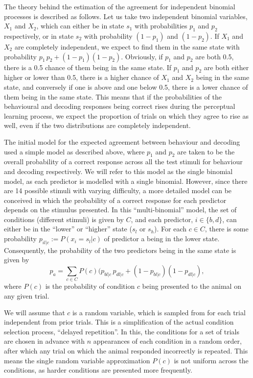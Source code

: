 The theory behind the estimation of the agreement for independent binomial processes is described as follows. Let us take two independent binomial variables, $X_1$ and $X_2$, which can either be in state $s_1$ with probabilities $p_1$ and $p_2$ respectively, or in state $s_2$ with probability $(1-p_1)$ and $(1-p_2)$.
If $X_1$ and $X_2$ are completely independent, we expect to find them in the same state with probability $p_1 \, p_2 + (1-p_1) (1-p_2)$. Obviously, if $p_1$ and $p_2$ are both 0.5, there is a 0.5 chance of them being in the same state.
If $p_1$ and $p_2$ are both either higher or lower than 0.5, there is a higher chance of $X_1$ and $X_2$ being in the same state, and conversely if one is above and one below 0.5, there is a lower chance of them being in the same state. This means that if the probabilities of the behavioural and decoding responses being correct rises during the perceptual learning process, we expect the proportion of trials on which they agree to rise as well, even if the two distributions are completely independent.

The initial model for the expected agreement between behaviour and decoding used a simple model as described above, where $p_1$ and $p_2$ are taken to be the overall probability of a correct response across all the test stimuli for behaviour and decoding respectively. We will refer to this model as the single binomial model, as each predictor is modelled with a single binomial.
However, since there are 14 possible stimuli with varying difficulty, a more detailed model can be conceived in which the probability of a correct response for each predictor depends on the stimulus presented. In this ``multi-binomial'' model, the set of conditions (different stimuli) is given by $C$, and each predictor, $i\in\{b,d\}$, can either be in the ``lower'' or ``higher'' state ($s_l$ or $s_h$).
For each $c\in C$, there is some probability $p_{il|c} := P(x_i=s_l|c)$ of predictor a being in the lower state. Consequently, the probability of the two predictors being in the same state is given by
$$p_a = \sum_{c\in C} P(c) (p_{bl|c} \, p_{dl|c} + (1-p_{bl|c}) (1-p_{dl|c}),$$
where $P(c)$ is the probability of condition $c$ being presented to the animal on any given trial.

We will assume that $c$ is a random variable, which is sampled from for each trial independent from prior trials. This is a simplification of the actual condition selection process, ``delayed repetition''. In this, the conditions for a set of trials are chosen in advance with $n$ appearances of each condition in a random order, after which any trial on which the animal responded incorrectly is repeated. This means the single random variable approximation $P(c)$ is not uniform across the conditions, as harder conditions are presented more frequently.

